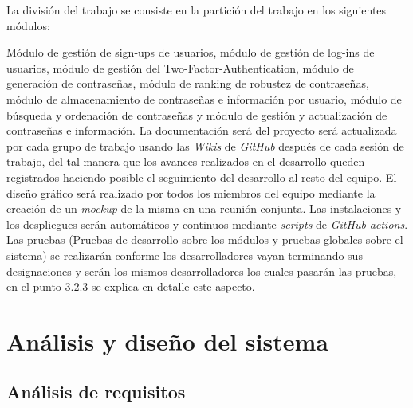 \documentclass{article}
\begin{document}
La división del trabajo se consiste en la partición del trabajo en los siguientes módulos:

Módulo de gestión de sign-ups de usuarios, módulo de gestión de log-ins de usuarios, 
módulo de gestión del Two-Factor-Authentication, módulo de generación de contraseñas, módulo de ranking de 
robustez de contraseñas, módulo de almacenamiento de contraseñas e información por usuario, módulo de búsqueda 
y ordenación de contraseñas y módulo de gestión y actualización de contraseñas e información. La documentación 
será del proyecto será actualizada por cada grupo de trabajo usando las \textit{Wikis} de \textit{GitHub} después de 
cada sesión de trabajo, del tal manera que los avances realizados en el desarrollo queden registrados haciendo 
posible el seguimiento del desarrollo al resto del equipo.
El diseño gráfico será realizado por todos los miembros del equipo mediante la creación de un \textit{mockup} 
de la misma en una reunión conjunta. 
Las instalaciones y los despliegues serán automáticos y continuos mediante \textit{scripts} de \textit{GitHub actions}. 
Las pruebas (Pruebas de desarrollo sobre los módulos y pruebas globales sobre el sistema) se realizarán conforme 
los desarrolladores vayan terminando sus designaciones y serán los mismos desarrolladores los cuales pasarán las 
pruebas, en el punto 3.2.3 se explica en detalle este aspecto. 

\pagebreak

\section{Análisis y diseño del sistema}

\subsection{Análisis de requisitos}
\end{document}
